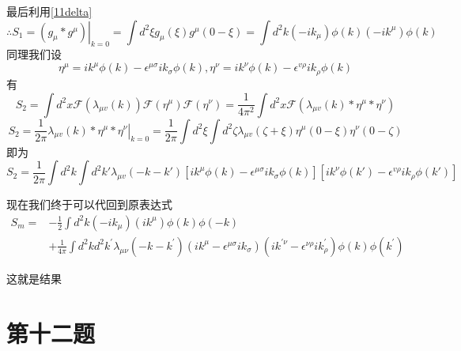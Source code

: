 \documentclass[a4paper]{ctexart}
\begin{document}
最后利用\ref{11delta}
$$
    \therefore S_1=\left. \left( g_{\mu}*g^{\mu} \right) \right|_{k=0}=\int{d}^2\xi g_{\mu}\left( \xi \right) g^{\mu}\left( 0-\xi \right) =\int{d}^2k\left( -ik_{\mu} \right) \phi \left( k \right) \left( -ik^{\mu} \right) \phi \left( k \right)
$$
同理我们设
$$
    \eta ^{\mu}=ik^{\mu}\phi \left( k \right) -\epsilon ^{\mu \sigma}ik_{\sigma}\phi \left( k \right) ,\eta ^{\nu}=ik^{\nu}\phi \left( k \right) -\epsilon ^{v\rho}ik_{\rho}\phi \left( k \right)
$$
有
$$
    S_2=\int{d}^2x\mathcal{F}\left( \lambda _{\mu v}\left( k \right) \right) \mathcal{F}\left( \eta ^{\mu} \right) \mathcal{F}\left( \eta ^{\nu} \right) =\frac{1}{4\pi ^2}\int{d}^2x\mathcal{F}\left( \lambda _{\mu v}\left( k \right) *\eta ^{\mu}*\eta ^{\nu} \right)
$$
$$
    S_2=\frac{1}{2\pi}\left. \lambda _{\mu v}\left( k \right) *\eta ^{\mu}*\eta ^{\nu} \right|_{k=0}=\frac{1}{2\pi}\int{d}^2\xi \int{d}^2\zeta \lambda _{\mu v}\left( \zeta +\xi \right) \eta ^{\mu}\left( 0-\xi \right) \eta ^{\nu}\left( 0-\zeta \right)
$$
即为
$$
    S_2=\frac{1}{2\pi}\int{d}^2k\int{d}^2k'\lambda _{\mu v}\left( -k-k' \right) \left[ ik^{\mu}\phi \left( k \right) -\epsilon ^{\mu \sigma}ik_{\sigma}\phi \left( k \right) \right] \left[ ik^{\nu}\phi \left( k' \right) -\epsilon ^{v\rho}ik_{\rho}\phi \left( k' \right) \right]
$$

现在我们终于可以代回到原表达式
$$
    \begin{aligned}
        S_{m}
        = & -\frac{1}{2} \int d^{2} k\left(-i k_{\mu}\right)\left(i k^{\mu}\right) \phi(k) \phi(-k)                                                                                                                                                                      \\
          & +\frac{1}{4 \pi} \int d^{2} k d^{2} k^{\prime} \lambda_{\mu \nu}\left(-k-k^{\prime}\right)\left(i k^{\mu}-\epsilon^{\mu \sigma} i k_{\sigma}\right)\left(i k^{\prime \nu}-\epsilon^{\nu \rho} i k_{\rho}^{\prime}\right) \phi(k) \phi\left(k^{\prime}\right)
    \end{aligned}
$$

这就是结果

\section{第十二题}
\end{document}
